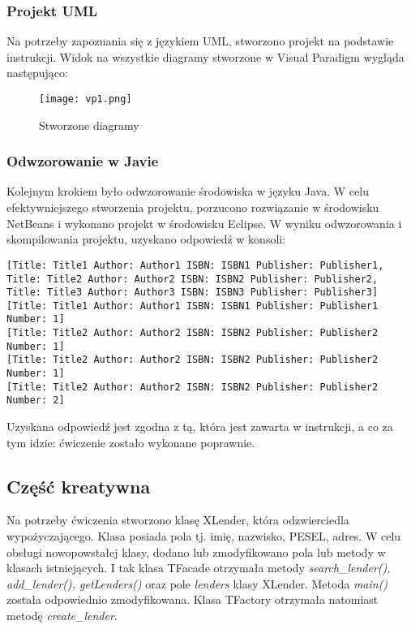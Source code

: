 \documentclass{article}
\begin{document}
\subsubsection{Projekt UML}
Na potrzeby zapoznania się z językiem UML, stworzono projekt na podstawie instrukcji. Widok na wszystkie diagramy stworzone w Visual Paradigm wygląda następująco:
\begin{figure}[h]
\centering
	\texttt{[image: vp1.png]}
	\caption{Stworzone diagramy}
	\label{fig:obrazek 1}
\end{figure}
\subsubsection{Odwzorowanie w Javie}
Kolejnym krokiem było odwzorowanie środowiska w języku Java. W celu efektywniejszego stworzenia projektu, porzucono rozwiązanie w środowisku NetBeans i wykonano projekt w środowisku Eclipse. W wyniku odwzorowania i skompilowania projektu, uzyskano odpowiedź w konsoli:
\begin{verbatim}
[Title: Title1 Author: Author1 ISBN: ISBN1 Publisher: Publisher1,
Title: Title2 Author: Author2 ISBN: ISBN2 Publisher: Publisher2,
Title: Title3 Author: Author3 ISBN: ISBN3 Publisher: Publisher3]
[Title: Title1 Author: Author1 ISBN: ISBN1 Publisher: Publisher1 Number: 1]
[Title: Title2 Author: Author2 ISBN: ISBN2 Publisher: Publisher2 Number: 1]
[Title: Title2 Author: Author2 ISBN: ISBN2 Publisher: Publisher2 Number: 1]
[Title: Title2 Author: Author2 ISBN: ISBN2 Publisher: Publisher2 Number: 2]
\end{verbatim}
Uzyskana odpowiedź jest zgodna z tą, która jest zawarta w instrukcji, a co za tym idzie: ćwiczenie zostało wykonane poprawnie.
\subsection{Część kreatywna}
Na potrzeby ćwiczenia stworzono klasę XLender, która odzwierciedla wypożyczającego. Klasa posiada pola tj. imię, nazwisko, PESEL, adres. W celu obsługi nowopowstałej klasy, dodano lub zmodyfikowano pola lub metody w klasach istniejących. I tak klasa TFacade otrzymała metody \textit{search\_lender(), add\_lender(), getLenders()} oraz pole \textit{lenders} klasy XLender. Metoda \textit{main()} została odpowiednio zmodyfikowana. Klasa TFactory otrzymała natomiast metodę \textit{create\_lender}.
\end{document}
